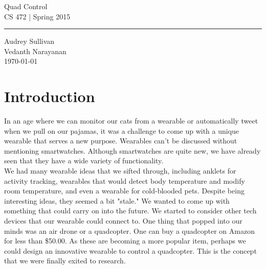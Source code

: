 \documentclass[12pt,letterpaper]{article}
\begin{document}
\begin{titlepage}
    \vspace*{4cm}
    \begin{flushright}
    {\huge
        Quad Control\\[5mm]
    }
    {\large
        CS 472 | Spring 2015
     }
    \end{flushright}
\hrule
    \begin{flushright}
	Audrey Sullivan\\
	Vedanth Narayanan\\
    \vfill
	\today\\
    \end{flushright}
\end{titlepage}

\raggedright

\section*{Introduction}
\hspace{1cm}In an age where we can monitor our cats from a wearable or automatically tweet when we pull on our pajamas, it was a challenge to come up with a unique wearable that serves a new purpose. Wearables can't be discussed without mentioning smartwatches. Although smartwatches are quite new, we have already seen that they have a wide variety of functionality.\\
\hspace{1cm}We had many wearable ideas that we sifted through, including anklets for activity tracking, wearables that would detect body temperature and modify room temperature, and even a wearable for cold-blooded pets. Despite being interesting ideas, they seemed a bit "stale." We wanted to come up with something that could carry on into the future. We started to consider other tech devices that our wearable could connect to. One thing that popped into our minds was an air drone or a quadcopter. One can buy a quadcopter on Amazon for less than \$50.00. As these are becoming a more popular item, perhaps we could design an innovative wearable to control a quadcopter. This is the concept that we were finally exited to research.
\end{document}
